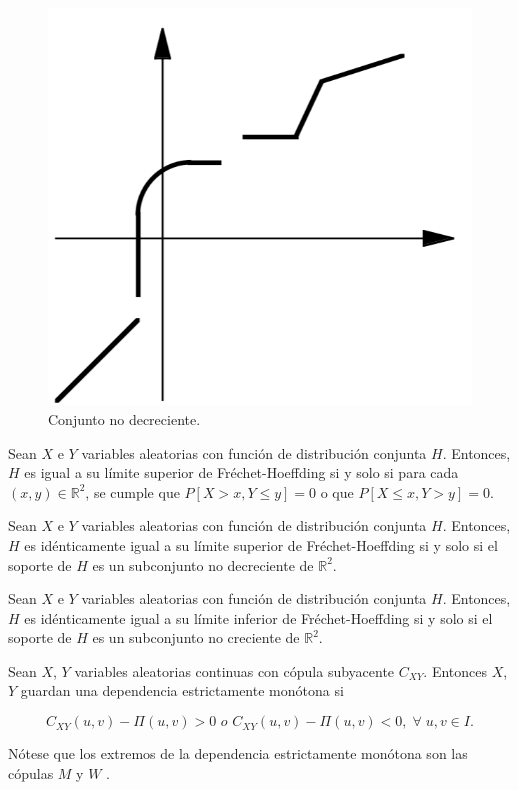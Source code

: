 \begin{figure}[H]
    \centering
    \includegraphics[width=0.4\linewidth]{Imagenes/nonDecrease.png}
    \caption{Conjunto no decreciente.}
    \label{fig:nondecrease}
\end{figure}

\begin{lema}\label{lemCotas}
    Sean $X$ e $Y$ variables aleatorias con función de distribución conjunta $H$. Entonces, $H$ es igual a su límite superior de Fréchet-Hoeffding si y solo si para cada $(x, y) \in \mathbb{R}^2$, se cumple que $P[X > x, Y \leq y] = 0$ o que $P[X \leq x, Y > y] = 0$.
\end{lema}

\begin{teor}
    Sean $X$ e $Y$ variables aleatorias con función de distribución conjunta $H$. Entonces, $H$ es idénticamente igual a su límite superior de Fréchet-Hoeffding si y solo si el soporte de $H$ es un subconjunto no decreciente de $\mathbb{R}^2$.
\end{teor}

\begin{teor}
    Sean $X$ e $Y$ variables aleatorias con función de distribución conjunta $H$. Entonces, $H$ es idénticamente igual a su límite inferior de Fréchet-Hoeffding si y solo si el soporte de $H$ es un subconjunto no creciente de $\mathbb{R}^2$.
\end{teor}

\begin{defn}
    Sean $X$, $Y$ variables aleatorias continuas con cópula subyacente $C_{XY}$. Entonces $X$, $Y$ guardan una dependencia
    estrictamente monótona si 
    
    \begin{equation}
        C_{XY}(u, v) - \Pi(u, v) > 0 \textit{ o } C_{XY}(u, v) - \Pi(u, v) < 0,\;  \forall \; u, v \in I.
    \end{equation}
    
    Nótese que los extremos de la dependencia estrictamente monótona son las cópulas $M$ y $W$ \cite[pág 42]{TesisEmanuel}.
\end{defn}


